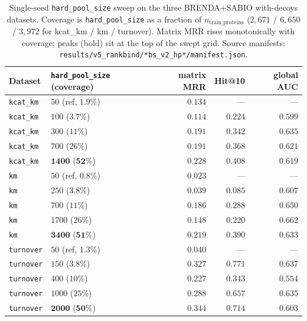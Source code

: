 \documentclass[11pt,a4paper]{article}
\newcommand{\gauc}{global AUC}
\newcommand{\matmrr}{matrix MRR}
\begin{document}
\begin{table}[h]
  \centering
  \footnotesize
  \setlength{\tabcolsep}{6pt}
  \begin{tabular}{llrrr}
    \toprule
    Dataset & \texttt{hard\_pool\_size} (coverage) & \matmrr & Hit@10 & \gauc \\
    \midrule
    \texttt{kcat\_km} & $50$ (ref, $1.9\%$)  & $0.134$ & ---     & ---     \\
    \texttt{kcat\_km} & $100$ ($3.7\%$)       & $0.114$ & $0.224$ & $0.599$ \\
    \texttt{kcat\_km} & $300$ ($11\%$)        & $0.191$ & $0.342$ & $0.635$ \\
    \texttt{kcat\_km} & $700$ ($26\%$)        & $0.191$ & $0.368$ & $0.621$ \\
    \texttt{kcat\_km} & $\mathbf{1400}$ ($\mathbf{52\%}$) & $\mathbf{0.228}$ & $\mathbf{0.408}$ & $0.619$ \\
    \midrule
    \texttt{km}       & $50$ (ref, $0.8\%$)  & $0.023$ & ---     & ---     \\
    \texttt{km}       & $250$ ($3.8\%$)       & $0.039$ & $0.085$ & $0.607$ \\
    \texttt{km}       & $700$ ($11\%$)        & $0.186$ & $0.288$ & $0.650$ \\
    \texttt{km}       & $1700$ ($26\%$)       & $0.148$ & $0.220$ & $0.662$ \\
    \texttt{km}       & $\mathbf{3400}$ ($\mathbf{51\%}$) & $\mathbf{0.219}$ & $\mathbf{0.390}$ & $0.633$ \\
    \midrule
    \texttt{turnover} & $50$ (ref, $1.3\%$)  & $0.040$ & ---     & ---     \\
    \texttt{turnover} & $150$ ($3.8\%$)       & $0.327$ & $0.771$ & $0.637$ \\
    \texttt{turnover} & $400$ ($10\%$)        & $0.227$ & $0.343$ & $0.554$ \\
    \texttt{turnover} & $1000$ ($25\%$)       & $0.288$ & $0.657$ & $0.635$ \\
    \texttt{turnover} & $\mathbf{2000}$ ($\mathbf{50\%}$) & $\mathbf{0.344}$ & $\mathbf{0.714}$ & $0.603$ \\
    \bottomrule
  \end{tabular}
  \caption{Single-seed \texttt{hard\_pool\_size} sweep on the three
  BRENDA+SABIO with-decoys datasets. Coverage is
  \texttt{hard\_pool\_size} as a fraction of $n_{\text{train\_proteins}}$
  ($2{,}671$ / $6{,}650$ / $3{,}972$ for kcat\_km / km / turnover).
  Matrix MRR rises monotonically with coverage; peaks (bold) sit at the
  top of the swept grid. Source manifests:
  \texttt{results/v5\_rankbind/*bs\_v2\_hp*/manifest.json}.}
  \label{tab:hpsweep}
\end{table}
\end{document}
